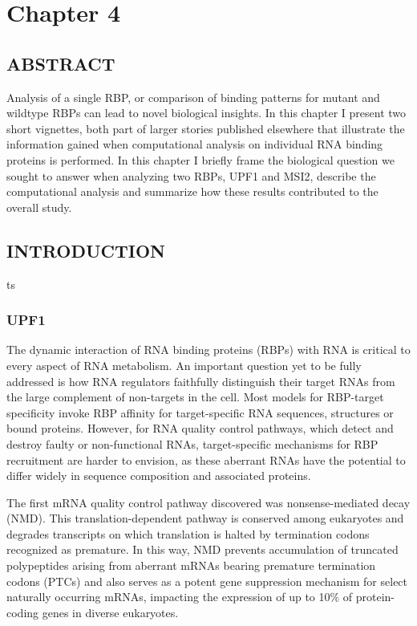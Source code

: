 \chapter{Chapter 4}

\section{ABSTRACT}
Analysis of a single RBP, or comparison of binding patterns for mutant and wildtype RBPs can lead to novel biological insights.  In this chapter I present two short vignettes, both part of larger stories published elsewhere that illustrate the information gained when computational analysis on individual RNA binding proteins is performed.  In this chapter I briefly frame the biological question we sought to answer when analyzing two RBPs, UPF1 and MSI2, describe the computational analysis and summarize how these results contributed to the overall study.  
 
\section{INTRODUCTION}
ts\subsection{UPF1}
The dynamic interaction of RNA binding proteins (RBPs) with RNA is critical to every aspect of RNA metabolism\cite{Moore2005}. An important question yet to be fully addressed is how RNA regulators faithfully distinguish their target RNAs from the large complement of non-targets in the cell. Most models for RBP-target specificity invoke RBP affinity for target-specific RNA sequences, structures or bound proteins\cite{Anko2012, Glisovic2008}. However, for RNA quality control pathways, which detect and destroy faulty or non-functional RNAs, target-specific mechanisms for RBP recruitment are harder to envision, as these aberrant RNAs have the potential to differ widely in sequence composition and associated proteins\cite{VanHoof2011,Porrua2013}.

The first mRNA quality control pathway discovered was nonsense-mediated decay (NMD)\cite{Leeds1991, Losson1979, Maquat1981, Pulak1993}. This translation-dependent pathway is conserved among eukaryotes and degrades transcripts on which translation is halted by termination codons recognized as premature. In this way, NMD prevents accumulation of truncated polypeptides arising from aberrant mRNAs bearing premature termination codons (PTCs) and also serves as a potent gene suppression mechanism for select naturally occurring mRNAs, impacting the expression of up to 10\% of protein-coding genes in diverse eukaryotes\cite{Schweingruber2013}.

